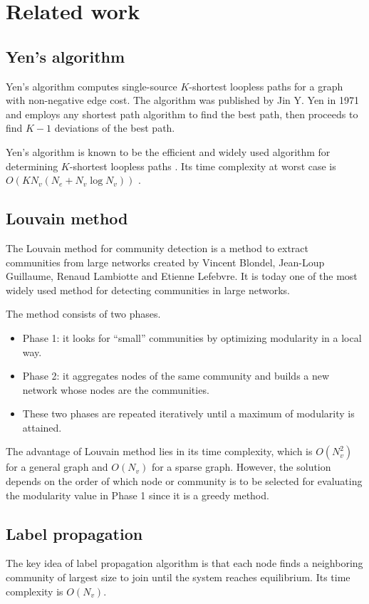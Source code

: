 \documentclass[journal]{IEEEtran}
\begin{document}
\section{Related work}
\subsection{Yen's algorithm}
Yen's algorithm \cite{Yen:1971aa} computes single-source $K$-shortest loopless paths for a graph with non-negative edge cost. The algorithm was published by Jin Y. Yen in 1971 and employs any shortest path algorithm to find the best path, then proceeds to find $K - 1$ deviations of the best path. 

Yen’s algorithm is known to be the efficient and widely used algorithm for determining $K$-shortest loopless paths \cite{Nagubadi:2013aa}. Its time complexity at worst case is $O(KN_{v}(N_{e} + N_{v} \log N_{v}))$ \cite{Labourdette:2006:PRM:1212284}.

\subsection{Louvain method}
The Louvain method \cite{1742-5468-2008-10-P10008} for community detection is a method to extract communities from large networks created by Vincent Blondel, Jean-Loup Guillaume, Renaud Lambiotte and Etienne Lefebvre. It is today one of the most widely used method for detecting communities in large networks. 

The method consists of two phases. 
\begin{itemize}
\item Phase 1: it looks for ``small'' communities by optimizing modularity in a local way. 
\item Phase 2: it aggregates nodes of the same community and builds a new network whose nodes are the communities. 
\item These two phases are repeated iteratively until a maximum of modularity is attained.
\end{itemize}

The advantage of Louvain method lies in its time complexity, which is $O(N_{v}^{2})$ for a general graph and $O(N_{v})$ for a sparse graph. However, the solution depends on the order of which node or community is to be selected for evaluating the modularity value in Phase 1
since it is a greedy method.

\subsection{Label propagation}
The key idea of label propagation algorithm \cite{PhysRevE.76.036106} is that each node finds a neighboring community of largest size to join until the system reaches equilibrium. Its time complexity is $O(N_{v})$.
\end{document}
